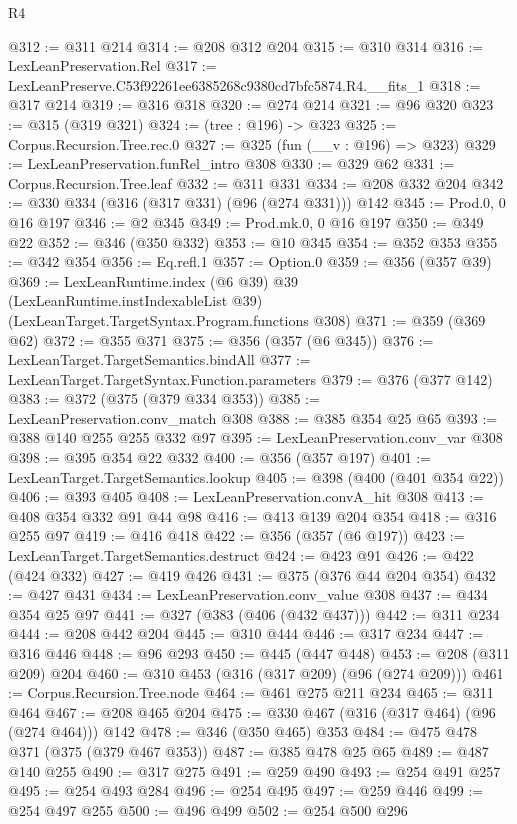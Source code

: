 \begin{lexlean}{R4}
\begin{coremodule}
@312 := @311 @214
@314 := @208 @312 @204
@315 := @310 @314
@316 := LexLeanPreservation.Rel
@317 := LexLeanPreserve.C53f92261ee6385268c9380cd7bfc5874.R4.__fits_1
@318 := @317 @214
@319 := @316 @318
@320 := @274 @214
@321 := @96 @320
@323 := @315 (@319 @321)
@324 := (tree : @196) -> @323
@325 := Corpus.Recursion.Tree.rec.{0}
@327 := @325 (fun (__v : @196) => @323)
@329 := LexLeanPreservation.funRel_intro @308
@330 := @329 @62
@331 := Corpus.Recursion.Tree.leaf
@332 := @311 @331
@334 := @208 @332 @204
@342 := @330 @334 (@316 (@317 @331) (@96 (@274 @331))) @142
@345 := Prod.{0, 0} @16 @197
@346 := @2 @345
@349 := Prod.mk.{0, 0} @16 @197
@350 := @349 @22
@352 := @346 (@350 @332)
@353 := @10 @345
@354 := @352 @353
@355 := @342 @354
@356 := Eq.refl.{1}
@357 := Option.{0}
@359 := @356 (@357 @39)
@369 := LexLeanRuntime.index
    (@6 @39)
    @39
    (LexLeanRuntime.instIndexableList @39)
    (LexLeanTarget.TargetSyntax.Program.functions @308)
@371 := @359 (@369 @62)
@372 := @355 @371
@375 := @356 (@357 (@6 @345))
@376 := LexLeanTarget.TargetSemantics.bindAll
@377 := LexLeanTarget.TargetSyntax.Function.parameters
@379 := @376 (@377 @142)
@383 := @372 (@375 (@379 @334 @353))
@385 := LexLeanPreservation.conv_match @308
@388 := @385 @354 @25 @65
@393 := @388 @140 @255 @255 @332 @97
@395 := LexLeanPreservation.conv_var @308
@398 := @395 @354 @22 @332
@400 := @356 (@357 @197)
@401 := LexLeanTarget.TargetSemantics.lookup
@405 := @398 (@400 (@401 @354 @22))
@406 := @393 @405
@408 := LexLeanPreservation.convA_hit @308
@413 := @408 @354 @332 @91 @44 @98
@416 := @413 @139 @204 @354
@418 := @316 @255 @97
@419 := @416 @418
@422 := @356 (@357 (@6 @197))
@423 := LexLeanTarget.TargetSemantics.destruct
@424 := @423 @91
@426 := @422 (@424 @332)
@427 := @419 @426
@431 := @375 (@376 @44 @204 @354)
@432 := @427 @431
@434 := LexLeanPreservation.conv_value @308
@437 := @434 @354 @25 @97
@441 := @327 (@383 (@406 (@432 @437)))
@442 := @311 @234
@444 := @208 @442 @204
@445 := @310 @444
@446 := @317 @234
@447 := @316 @446
@448 := @96 @293
@450 := @445 (@447 @448)
@453 := @208 (@311 @209) @204
@460 := @310 @453 (@316 (@317 @209) (@96 (@274 @209)))
@461 := Corpus.Recursion.Tree.node
@464 := @461 @275 @211 @234
@465 := @311 @464
@467 := @208 @465 @204
@475 := @330 @467 (@316 (@317 @464) (@96 (@274 @464))) @142
@478 := @346 (@350 @465) @353
@484 := @475 @478 @371 (@375 (@379 @467 @353))
@487 := @385 @478 @25 @65
@489 := @487 @140 @255
@490 := @317 @275
@491 := @259 @490
@493 := @254 @491 @257
@495 := @254 @493 @284
@496 := @254 @495
@497 := @259 @446
@499 := @254 @497 @255
@500 := @496 @499
@502 := @254 @500 @296

\end{coremodule}
\end{lexlean}
